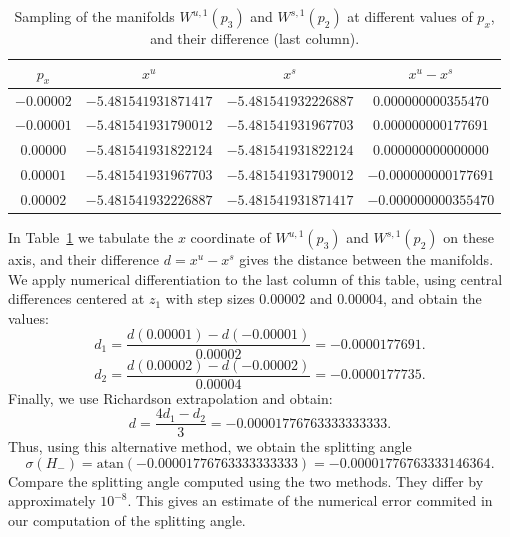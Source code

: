 \begin{table}
\begin{tabular}{|c|c|c|c|}
\hline
$p_x$ & $x^u$ & $x^s$ & $x^u-x^s$ \\
\hline
$-0.00002$ & $-5.481541931871417$ & $-5.481541932226887$ &
$0.000000000355470$ \\
$-0.00001$ & $-5.481541931790012$ & $-5.481541931967703$ &
$0.000000000177691$ \\
$0.00000$ & $-5.481541931822124$ & $-5.481541931822124$ &
$0.000000000000000$ \\
$0.00001$ & $-5.481541931967703$ & $-5.481541931790012$ &
$-0.000000000177691$ \\
$0.00002$ & $-5.481541932226887$ & $-5.481541931871417$ &
$-0.000000000355470$\\
\hline
\end{tabular}
\caption{Sampling of the manifolds $W^{u,1}(p_3)$ and $W^{s,1}(p_2)$ at
different values of $p_x$, and their difference (last column).}
\label{tab:differentiation}
\end{table}

In Table~\ref{tab:differentiation} we tabulate the $x$ coordinate of
$W^{u,1}(p_3)$ and $W^{s,1}(p_2)$ on these axis, and their difference
$d=x^u-x^s$ gives the distance between the manifolds.
We apply numerical differentiation to the last column of this table,
using central differences centered at $z_1$ with step sizes $0.00002$
and $0.00004$, and obtain the values:
\[ d_1 = \frac{d(0.00001) - d(-0.00001)}{0.00002} =
-0.0000177691.\]
\[ d_2 = \frac{d(0.00002) - d(-0.00002)}{0.00004} =
-0.0000177735.\]
Finally, we use Richardson extrapolation and obtain:
\[ d = \frac{4 d_1-d_2}{3} = -0.00001776763333333333. \]
Thus, using this alternative method, we obtain the splitting angle
\[ \sigma(H_-) = \mathrm{atan}(-0.00001776763333333333) =
-0.00001776763333146364. \]
Compare the splitting angle computed using the two methods. They
differ by approximately $10^{-8}$.
This gives an estimate of the numerical error commited in our
computation of the splitting angle.

